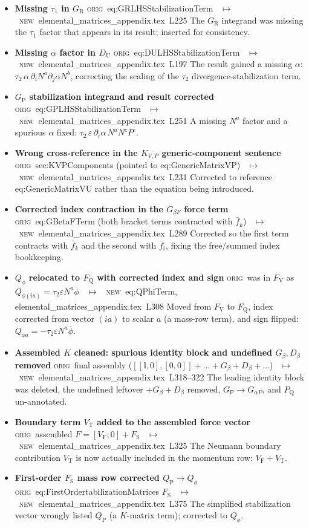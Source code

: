 \documentclass[11pt]{article}
\newcommand{\Orig}{\textcolor{origc}{\footnotesize\textsc{orig}}}
\newcommand{\New}{\textcolor{newc}{\footnotesize\textsc{new}}}
\newcommand{\code}[1]{\textcolor{newc}{\ttfamily\small #1}}
\newcommand{\appl}[2]{#1~L#2}          %
\newcommand{\ch}[4]{%
  \item \textbf{#1}\newline
    {\footnotesize\Orig\ #2 \ \textcolor{locc}{$\longmapsto$} \ \New\ #3}\newline
    #4}
\begin{document}
\begin{itemize}
   {\appl{elemental\_matrices\_appendix.tex}{154}}
   {$\partial\beta$ (no contracted index) corrected to $\partial_m\beta$, matching the summed index.}
\ch{Missing $\tau_1$ in $G_{\mathrm R}$}
   {\code{eq:GRLHSStabilizationTerm}}
   {\appl{elemental\_matrices\_appendix.tex}{225}}
   {The $G_{\mathrm R}$ integrand was missing the $\tau_1$ factor that appears in its result; inserted
    for consistency.}
\ch{Missing $\alpha$ factor in $D_{\mathrm U}$}
   {\code{eq:DULHSStabilizationTerm}}
   {\appl{elemental\_matrices\_appendix.tex}{197}}
   {The result gained a missing $\alpha$: $\tau_2\,\alpha\,\partial_iN^a\partial_j\alpha N^b$,
    correcting the scaling of the $\tau_2$ divergence-stabilization term.}
\ch{$G_{\mathrm P}$ stabilization integrand and result corrected}
   {\code{eq:GPLHSStabilizationTerm}}
   {\appl{elemental\_matrices\_appendix.tex}{251}}
   {A missing $N^a$ factor and a spurious $\alpha$ fixed:
    $\tau_2\,\varepsilon\,\partial_i\alpha\,N^aN^cP^c$.}
\ch{Wrong cross-reference in the $K_{V,P}$ generic-component sentence}
   {\code{sec:KVPComponents} (pointed to \code{eq:GenericMatrixVP})}
   {\appl{elemental\_matrices\_appendix.tex}{231}}
   {Corrected to reference \code{eq:GenericMatrixVU} rather than the equation being introduced.}
\ch{Corrected index contraction in the $G_{\beta F}$ force term}
   {\code{eq:GBetaFTerm} (both bracket terms contracted with $\bar f_k$)}
   {\appl{elemental\_matrices\_appendix.tex}{289}}
   {Corrected so the first term contracts with $\bar f_k$ and the second with $\bar f_i$, fixing the
    free/summed index bookkeeping.}
\ch{$Q_\phi$ relocated to $F_{\mathrm Q}$ with corrected index and sign}
   {was in $F_{\mathrm V}$ as $Q_{\phi(ia)}=\tau_2\varepsilon N^a\overline\phi$}
   {\code{eq:QPhiTerm}, \appl{elemental\_matrices\_appendix.tex}{308}}
   {Moved from $F_{\mathrm V}$ to $F_{\mathrm Q}$, index corrected from vector $(ia)$ to scalar $a$
    (a mass-row term), and sign flipped: $Q_{\phi a}=-\tau_2\varepsilon N^a\overline\phi$.}
\ch{Assembled $K$ cleaned: spurious identity block and undefined $G_\beta,D_\beta$ removed}
   {final assembly ($[[\mathbb I,0],[0,0]]+\dots+G_\beta+D_\beta+\dots$)}
   {\appl{elemental\_matrices\_appendix.tex}{318}--322}
   {The leading identity block was deleted, the undefined leftover $+G_\beta+D_\beta$ removed,
    $G_{\mathrm P}\to G_{\alpha P}$, and $P_{\mathrm Q}$ un-annotated.}
\ch{Boundary term $V_{\mathrm T}$ added to the assembled force vector}
   {assembled $F=[V_{\mathrm F};0]+F_{\mathrm S}$}
   {\appl{elemental\_matrices\_appendix.tex}{325}}
   {The Neumann boundary contribution $V_{\mathrm T}$ is now actually included in the momentum row:
    $V_{\mathrm F}+V_{\mathrm T}$.}
\ch{First-order $F_{\mathrm S}$ mass row corrected $Q_{\mathrm P}\to Q_\phi$}
   {\code{eq:FirstOrdertabilizationMatrices} $F_{\mathrm S}$}
   {\appl{elemental\_matrices\_appendix.tex}{375}}
   {The simplified stabilization vector wrongly listed $Q_{\mathrm P}$ (a $K$-matrix term); corrected
    to $Q_\phi$.}
\end{itemize}
\end{document}

